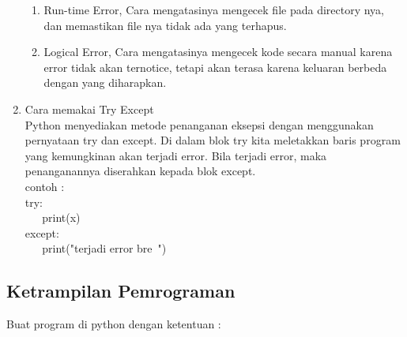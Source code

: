 \begin{enumerate}
\begin{enumerate}
\item Run-time Error, Cara mengatasinya mengecek file pada directory nya, dan memastikan file nya tidak ada yang terhapus.\\
\item Logical Error, Cara mengatasinya mengecek kode secara manual karena error tidak akan ternotice, tetapi akan terasa karena keluaran berbeda dengan yang diharapkan.\\
\end{enumerate}
\item Cara memakai Try Except\\
Python menyediakan metode penanganan eksepsi dengan menggunakan pernyataan try dan except. Di dalam blok try kita meletakkan baris program yang kemungkinan akan terjadi error. Bila terjadi error, maka penanganannya diserahkan kepada blok except.\\
contoh :\\
try:\\
\verb|   |print(x)\\
except:\\
\verb|   |print("terjadi error bre~")\\
\end{enumerate}

\subsection{Ketrampilan Pemrograman}
Buat program di python dengan ketentuan :

